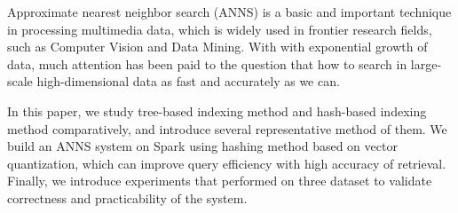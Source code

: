 \begin{eabstract}
   Approximate nearest neighbor search (ANNS) is a basic and important technique
   in processing multimedia data, which is widely used in frontier research fields,
   such as Computer Vision and Data Mining. With with exponential growth of data, much
   attention has been paid to the question that how to search in large-scale
   high-dimensional data as fast and accurately as we can.

   In this paper, we study tree-based indexing method and hash-based indexing
   method comparatively, and introduce several representative method of them. We build
   an ANNS system on Spark using hashing method based on vector quantization, which can
   improve query efficiency with high accuracy of retrieval. Finally, we introduce
   experiments that performed on three dataset to validate correctness and practicability
   of the system.
\end{eabstract}

